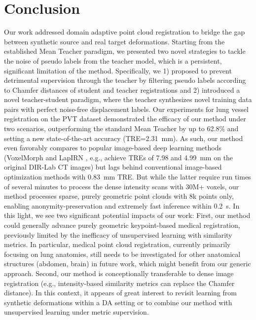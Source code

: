 \documentclass[runningheads]{llncs}
\begin{document}
\section{Conclusion}
Our work addressed domain adaptive point cloud registration to bridge the gap between synthetic source and real target deformations.
Starting from the established Mean Teacher paradigm, we presented two novel strategies to tackle the noise of pseudo labels from the teacher model, which is a persistent, significant limitation of the method.
Specifically, we 1) proposed to prevent detrimental supervision through the teacher by filtering pseudo labels according to Chamfer distances of student and teacher registrations and 2) introduced a novel teacher-student paradigm, where the teacher synthesizes novel training data pairs with perfect noise-free displacement labels.
Our experiments for lung vessel registration on the PVT dataset demonstrated the efficacy of our method under two scenarios, outperforming the standard Mean Teacher by up to 62.8\% and setting a new state-of-the-art accuracy (TRE=\SI{2.31}{mm}).
As such, our method even favorably compares to popular image-based deep learning methods (VoxelMorph \cite{balakrishnan2019voxelmorph} and LapIRN \cite{mok2020large}, e.g., achieve TREs of 7.98 and \SI{4.99}{mm} on the original DIR-Lab CT images) but lags behind conventional image-based optimization methods \cite{ruhaak2017estimation} with \SI{0.83}{mm} TRE.
But while the latter require run times of several minutes to process the dense intensity scans with 30M+ voxels, our method processes sparse, purely geometric point clouds with 8k points only, enabling anonymity-preservation and extremely fast inference within \SI{0.2}{s}.
In this light, we see two significant potential impacts of our work:
First, our method could generally advance purely geometric keypoint-based medical registration, previously limited by the inefficacy of unsupervised learning with similarity metrics.
In particular, medical point cloud registration, currently primarily focusing on lung anatomies, still needs to be investigated for other anatomical structures (abdomen, brain) in future work, which might benefit from our generic approach.
Second, our method is conceptionally transferable to dense image registration (e.g., intensity-based similarity metrics \cite{heinrich2012mind,de2020mutual} can replace the Chamfer distance).
In this context, it appears of great interest to revisit learning from synthetic deformations \cite{eppenhof2018pulmonary} within a DA setting or to combine our method with unsupervised learning under metric supervision.
\end{document}
